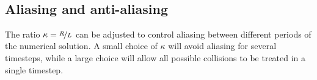 \begin{table}
\centering
{} \\
\caption{
    Numerical evidence for the exponential decay of $f_\cA$ (see Section~\vref{sec:decay} for details).
    The table shows $\sup_t\|f_\cA \mu_a^{-1}\|_{L^2(\cD_L)}$ for various $N$ and $L$. The test case
    was the crossed streams setup from Section~\vref{sec:crossed}, and integrated until $T=10$.
}
\label{tbl:numbers}
\end{table}

\subsection{Aliasing and anti-aliasing} \label{sec:aliasing}

The ratio $\kappa=\nicefrac{R}{L}$ can be adjusted to control aliasing between
different periods of the numerical solution. A small choice of $\kappa$ will
avoid aliasing for several timesteps, while a large choice will allow all
possible collisions to be treated in a single timestep.

